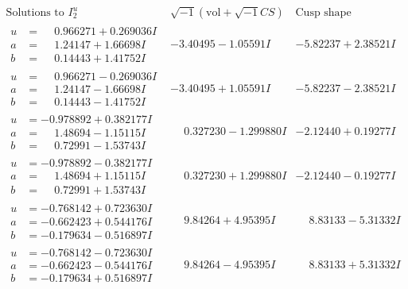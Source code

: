 \documentclass[1p]{elsarticle_modified}
\theoremstyle{definition}
\newcommand{\I}{\sqrt{-1}}
\begin{document}
$$\begin{array}{c|c|c}  
\text{Solutions to }I^u_{2}& \I (\text{vol} + \sqrt{-1}CS) & \text{Cusp shape}\\
 \hline 
\begin{aligned}
u &= \phantom{-}0.966271 + 0.269036 I \\
a &= \phantom{-}1.24147 + 1.66698 I \\
b &= \phantom{-}0.14443 + 1.41752 I\end{aligned}
 & -3.40495 - 1.05591 I & -5.82237 + 2.38521 I \\ \hline\begin{aligned}
u &= \phantom{-}0.966271 - 0.269036 I \\
a &= \phantom{-}1.24147 - 1.66698 I \\
b &= \phantom{-}0.14443 - 1.41752 I\end{aligned}
 & -3.40495 + 1.05591 I & -5.82237 - 2.38521 I \\ \hline\begin{aligned}
u &= -0.978892 + 0.382177 I \\
a &= \phantom{-}1.48694 - 1.15115 I \\
b &= \phantom{-}0.72991 - 1.53743 I\end{aligned}
 & \phantom{-}0.327230 - 1.299880 I & -2.12440 + 0.19277 I \\ \hline\begin{aligned}
u &= -0.978892 - 0.382177 I \\
a &= \phantom{-}1.48694 + 1.15115 I \\
b &= \phantom{-}0.72991 + 1.53743 I\end{aligned}
 & \phantom{-}0.327230 + 1.299880 I & -2.12440 - 0.19277 I \\ \hline\begin{aligned}
u &= -0.768142 + 0.723630 I \\
a &= -0.662423 + 0.544176 I \\
b &= -0.179634 - 0.516897 I\end{aligned}
 & \phantom{-}9.84264 + 4.95395 I & \phantom{-}8.83133 - 5.31332 I \\ \hline\begin{aligned}
u &= -0.768142 - 0.723630 I \\
a &= -0.662423 - 0.544176 I \\
b &= -0.179634 + 0.516897 I\end{aligned}
 & \phantom{-}9.84264 - 4.95395 I & \phantom{-}8.83133 + 5.31332 I \\ \hline\begin{aligned}

\end{aligned}
\end{array}$$
\end{document}
